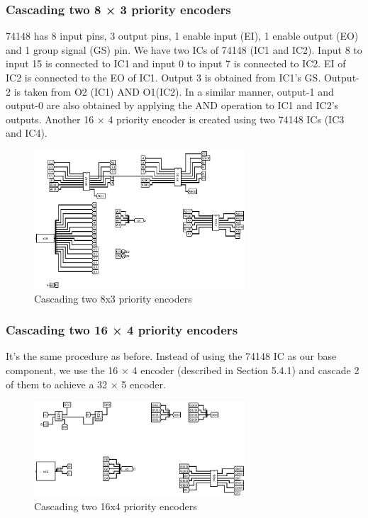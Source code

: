 \documentclass{article}
\begin{document}
\subsubsection{\textbf{Cascading two 8 × 3 priority encoders}}
74148 has 8 input pins, 3 output pins, 1 enable input (EI), 1 enable output (EO)
and 1 group signal (GS) pin. We have two ICs of 74148 (IC1 and IC2). Input
8 to input 15 is connected to IC1 and input 0 to input 7 is connected to IC2.
EI of IC2 is connected to the EO of IC1. Output 3 is obtained from IC1’s GS.
Output-2 is taken from O2 (IC1) AND O1(IC2). In a similar manner, output-1
and output-0 are also obtained by applying the AND operation to IC1 and IC2’s
outputs. Another 16 × 4 priority encoder is created using two 74148 ICs (IC3
and IC4).
\begin{figure}[h]
    \centering 
    \includegraphics[width = 0.7\textwidth]{16_4}
    \caption{Cascading two 8x3 priority encoders}
\end{figure}
\subsubsection{\textbf{Cascading two 16 × 4 priority encoders}}
It’s the same procedure as before. Instead of using the 74148 IC as our base
component, we use the 16 × 4 encoder (described in Section 5.4.1) and cascade
2 of them to achieve a 32 × 5 encoder.
\begin{figure}[h]
    \centering 
    \includegraphics[width = 0.7\textwidth]{32_5}
    \caption{Cascading two 16x4 priority encoders}
\end{figure}
\pagebreak
\end{document}
